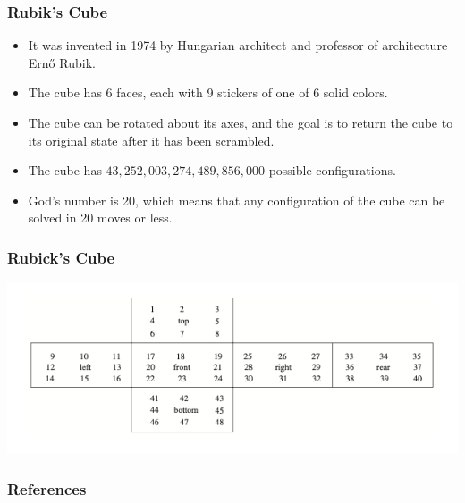 \documentclass{beamer}
\begin{document}
\begin{frame}
    \frametitle{Rubik's Cube}

    \begin{itemize}
        \item It was invented in 1974 by Hungarian architect and professor of architecture Ernő Rubik. \pause
        \item The cube has 6 faces, each with 9 stickers of one of 6 solid colors. \pause
        \item The cube can be rotated about its axes, and the goal is to return the cube to its original state after it has been scrambled. \pause
        \item The cube has \(43,252,003,274,489,856,000\) possible configurations. \pause
        \item God’s number is 20, which means that any configuration of the cube can be solved in 20 moves or less.
    \end{itemize}

\end{frame}

\begin{frame}
    \frametitle{Rubick's Cube}

    \includegraphics[scale=0.5]{Figures/fig_5.png}

\end{frame}





\begin{frame}
    \frametitle{References}
\end{frame}
\end{document}
